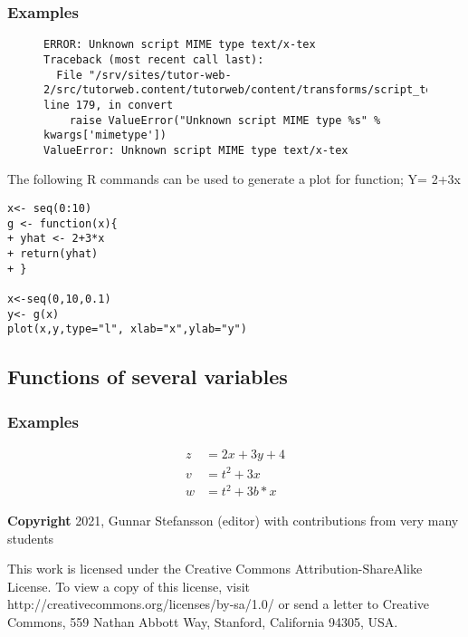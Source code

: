 \documentclass[12pt,a4paper]{article}
\theoremstyle{regla}
\theoremstyle{remark}
\theoremstyle{definition}
\theoremstyle{nonumberbreak}
\begin{document}
\subsubsection{Examples}
\begin{figure}[h]
\hspace{0.5mm}
\begin{minipage}{0.48\textwidth}
\begin{verbatim}ERROR: Unknown script MIME type text/x-tex
Traceback (most recent call last):
  File "/srv/sites/tutor-web-2/src/tutorweb.content/tutorweb/content/transforms/script_to_html.py", line 179, in convert
    raise ValueError("Unknown script MIME type %s" % kwargs['mimetype'])
ValueError: Unknown script MIME type text/x-tex
\end{verbatim}

\end{minipage}
\end{figure}
\begin{xmpl}
The following R commands can be used to generate a plot for function; Y= 2+3x

\begin{lstlisting}
x<- seq(0:10)
g <- function(x){
+ yhat <- 2+3*x
+ return(yhat)
+ }
 
x<-seq(0,10,0.1)
y<- g(x)
plot(x,y,type="l", xlab="x",ylab="y")
\end{lstlisting}
\end{xmpl}

\subsection{Functions of several variables}
\subsubsection{Examples}
\begin{xmpl}
\begin{align}
z &= 2x+3y+4\\
v &= t^2+3x\\
w &= t^2+3b*x
\end{align}
\end{xmpl}

{\bf Copyright}
2021, Gunnar Stefansson (editor) with contributions from very many students

This work is licensed under the Creative Commons
Attribution-ShareAlike License. To view a copy of this license, visit
http://creativecommons.org/licenses/by-sa/1.0/ or send a letter to
Creative Commons, 559 Nathan Abbott Way, Stanford, California 94305,
USA.
\clearpage
\end{document}
